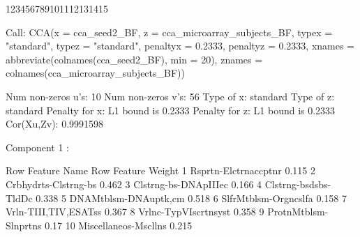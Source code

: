 \documentclass{article}\usepackage[]{graphicx}\usepackage[]{color}
\begin{document}
\begin{Schunk}
{}

\begin{Soutput}
123456789101112131415
\end{Soutput}
\begin{Soutput}
Call: CCA(x = cca_seed2_BF, z = cca_microarray_subjects_BF, typex = "standard", 
    typez = "standard", penaltyx = 0.2333, penaltyz = 0.2333, 
    xnames = abbreviate(colnames(cca_seed2_BF), min = 20), znames = colnames(cca_microarray_subjects_BF))


Num non-zeros u's:  10 
Num non-zeros v's:  56 
Type of x:  standard 
Type of z:  standard 
Penalty for x: L1 bound is  0.2333 
Penalty for z: L1 bound is  0.2333 
Cor(Xu,Zv):  0.9991598

 Component  1 :

   Row Feature Name     Row Feature Weight
1  Rsprtn-Elctrnaccptnr 0.115             
2  Crbhydrts-Clstrng-bs 0.462             
3  Clstrng-bs-DNApIIIec 0.166             
4  Clstrng-bsdsbs-TldDc 0.338             
5  DNAMtblsm-DNAuptk,cm 0.518             
6  SlfrMtblsm-Orgncslfa 0.158             
7  Vrln-TIII,TIV,ESATss 0.367             
8  Vrlnc-TypVIscrtnsyst 0.358             
9  ProtnMtblsm-Slnprtns 0.17              
10 Miscellaneos-Mscllns 0.215             


\end{Soutput}
\end{Schunk}
\end{document}
